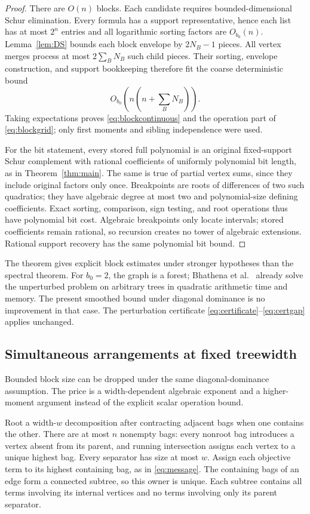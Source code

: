 \begin{proof}
There are $O(n)$ blocks. Each candidate requires bounded-dimensional Schur
elimination. Every formula has a support representative, hence each list
has at most $2^n$ entries and all logarithmic sorting factors are $O_{b_0}(n)$.
Lemma~\ref{lem:DS} bounds each block envelope by $2N_B-1$ pieces.
All vertex merges process at most $2\sum_B N_B$ such child pieces.
Their sorting, envelope construction, and support bookkeeping therefore
fit the coarse deterministic bound
\[
 O_{b_0}\!\left(n\left(n+\sum_BN_B\right)\right).
\]
Taking expectations proves \eqref{eq:blockcontinuous} and the operation
part of \eqref{eq:blockgrid}; only first moments and sibling independence
were used.

For the bit statement, every stored full polynomial is an original
fixed-support Schur complement with rational coefficients of uniformly
polynomial bit length, as in Theorem~\ref{thm:main}. The same is true of
partial vertex sums, since they include original factors only once.
Breakpoints are roots of differences of two such quadratics; they have
algebraic degree at most two and polynomial-size defining coefficients.
Exact sorting, comparison, sign testing, and root operations thus have
polynomial bit cost. Algebraic breakpoints only locate intervals; stored
coefficients remain rational, so recursion creates no tower of algebraic
extensions. Rational support recovery has the same polynomial bit bound.
\end{proof}

The theorem gives explicit block estimates under stronger hypotheses than
the spectral theorem. For $b_0=2$, the graph is a forest; Bhathena et al.\
\cite{BhathenaTrees} already solve the unperturbed problem on arbitrary trees
in quadratic arithmetic time and memory. The present smoothed bound under
diagonal dominance is no improvement in that case. The perturbation certificate
\eqref{eq:certificate}--\eqref{eq:certgap} applies unchanged.

\subsection{Simultaneous arrangements at fixed treewidth}
Bounded block size can be dropped under the same diagonal-dominance
assumption. The price is a width-dependent algebraic exponent and a
higher-moment argument instead of the explicit scalar operation bound.

Root a width-$w$ decomposition after contracting adjacent bags when one
contains the other. There are at most $n$ nonempty bags: every nonroot bag
introduces a vertex absent from its parent, and running intersection assigns
each vertex to a unique highest bag. Every separator has size at most $w$.
Assign each objective term to its highest containing bag, as in
\eqref{eq:message}. The containing bags of an edge form a connected subtree,
so this owner is unique. Each subtree contains all terms involving its
internal vertices and no terms involving only its parent separator.

